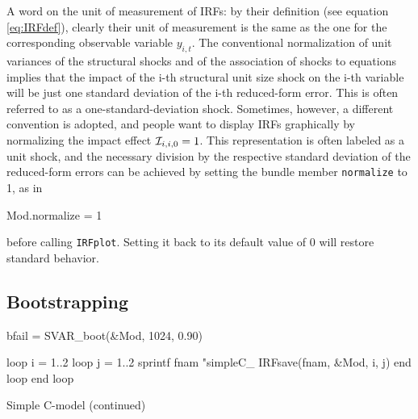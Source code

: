 \documentclass[a4paper,10pt]{article}
\newcommand{\cmd}[1]{\texttt{#1}}
\newcommand{\IRF}[1]{\ensuremath \mathcal{I}_{#1}}
\begin{document}
A word on the unit of measurement of IRFs: by their definition (see
equation \eqref{eq:IRFdef}), clearly their unit of measurement is
the same as the one for the corresponding observable variable
$y_{i,t}$. 
The conventional normalization of unit variances of the structural shocks 
and of the association of shocks to equations implies that the impact of the 
i-th structural unit size shock on the i-th variable will be just one standard 
deviation of the i-th reduced-form error. 
This is often referred to as a one-standard-deviation shock.
Sometimes, however, a different convention is adopted, and
people want to display IRFs graphically by normalizing the impact 
effect $\IRF{i,i,0} = 1$.
This representation is often labeled as a unit shock, and the necessary division 
by the respective standard deviation of the reduced-form errors 
can be achieved by setting the bundle member \cmd{normalize}
to 1, as in
\begin{code}
  Mod.normalize = 1
\end{code}
before calling \cmd{IRFplot}. Setting it back to its default value of
0 will restore standard behavior.

\subsection{Bootstrapping}
\label{sec:bootstrap}

\begin{table}[htbp]
\begin{scode}
  bfail = SVAR_boot(&Mod, 1024, 0.90)

  loop i = 1..2
      loop j = 1..2 
          sprintf fnam "simpleC_%
          IRFsave(fnam, &Mod, i, j)
      end loop
  end loop
  \end{scode}
  \caption{Simple C-model (continued)}
  \label{tab:simpleC-IRF}
\end{table}
\end{document}
